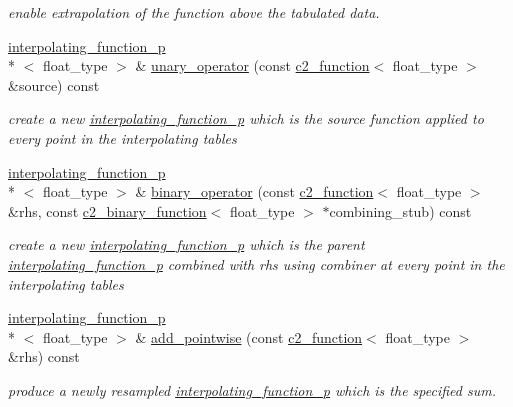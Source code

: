\begin{DoxyCompactItemize}
\begin{DoxyCompactList}\small\item\em enable extrapolation of the function above the tabulated data. \end{DoxyCompactList}\item 
\hyperlink{classinterpolating__function__p}{interpolating\-\_\-function\-\_\-p}\\*
$<$ float\-\_\-type $>$ \& \hyperlink{classinterpolating__function__p_aae37d6b9356c6bb5d1bed631b036abba}{unary\-\_\-operator} (const \hyperlink{classc2__function}{c2\-\_\-function}$<$ float\-\_\-type $>$ \&source) const 
\begin{DoxyCompactList}\small\item\em create a new \hyperlink{classinterpolating__function__p}{interpolating\-\_\-function\-\_\-p} which is the {\itshape source} function applied to every point in the interpolating tables \end{DoxyCompactList}\item 
\hyperlink{classinterpolating__function__p}{interpolating\-\_\-function\-\_\-p}\\*
$<$ float\-\_\-type $>$ \& \hyperlink{classinterpolating__function__p_acb0a8005ae431aa90098bc6466f7bd77}{binary\-\_\-operator} (const \hyperlink{classc2__function}{c2\-\_\-function}$<$ float\-\_\-type $>$ \&rhs, const \hyperlink{classc2__binary__function}{c2\-\_\-binary\-\_\-function}$<$ float\-\_\-type $>$ $\ast$combining\-\_\-stub) const 
\begin{DoxyCompactList}\small\item\em create a new \hyperlink{classinterpolating__function__p}{interpolating\-\_\-function\-\_\-p} which is the parent \hyperlink{classinterpolating__function__p}{interpolating\-\_\-function\-\_\-p} combined with {\itshape rhs} using {\itshape combiner} at every point in the interpolating tables \end{DoxyCompactList}\item 
\hyperlink{classinterpolating__function__p}{interpolating\-\_\-function\-\_\-p}\\*
$<$ float\-\_\-type $>$ \& \hyperlink{classinterpolating__function__p_ac40d79c0de3ceab3168ac8906de4f719}{add\-\_\-pointwise} (const \hyperlink{classc2__function}{c2\-\_\-function}$<$ float\-\_\-type $>$ \&rhs) const 
\begin{DoxyCompactList}\small\item\em produce a newly resampled \hyperlink{classinterpolating__function__p}{interpolating\-\_\-function\-\_\-p} which is the specified sum. \end{DoxyCompactList}\item 

\end{DoxyCompactItemize}
